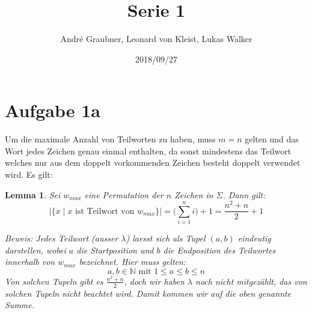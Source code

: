 \documentclass[a4paper]{article}
\title{Serie 1}
\author{André Graubner, Leonard von Kleist, Lukas Walker}
\date{2018/09/27}
\newtheorem{lemma}{Lemma}
\begin{document}
 

\maketitle

\section{Aufgabe 1a}
	Um die maximale Anzahl von Teilworten zu haben,
	muss $m = n$ gelten und das Wort jedes Zeichen
	genau einmal enthalten, da sonst mindestens das
	Teilwort welches nur aus dem doppelt vorkommenden
	Zeichen besteht doppelt verwendet wird. Es gilt:

	\begin{lemma}
		Sei $w_{max}$ eine Permutation der $n$ Zeichen in $\Sigma$. Dann gilt:
		\[\Bigg\lvert \Big\{x \mid x \text{ ist Teilwort von } w_{max} \Big\} \Bigg\lvert = 
		\bigg(\sum_{i=1}^{n} i\bigg) + 1 = \frac{n^2 + n}{2} + 1 \]

		Beweis:
		Jedes Teilwort (ausser $\lambda$) laesst sich als Tupel $(a,b)$ eindeutig darstellen,
		wobei $a$ die Startposition und $b$ die Endposition des Teilwortes
		innerhalb von $w_{max}$ bezeichnet. Hier muss gelten:
		\[a, b \in \mathbb{N} \text{ mit } 1 \leq a \leq b \leq n\]
		Von solchen Tupeln gibt es $\frac{n^2 + n}{2}$, doch wir haben $\lambda$
		noch nicht mitgezählt, das von solchen Tupeln nicht beachtet wird.
		Damit kommen wir auf die oben genannte Summe.
	\end{lemma}
\end{document}
